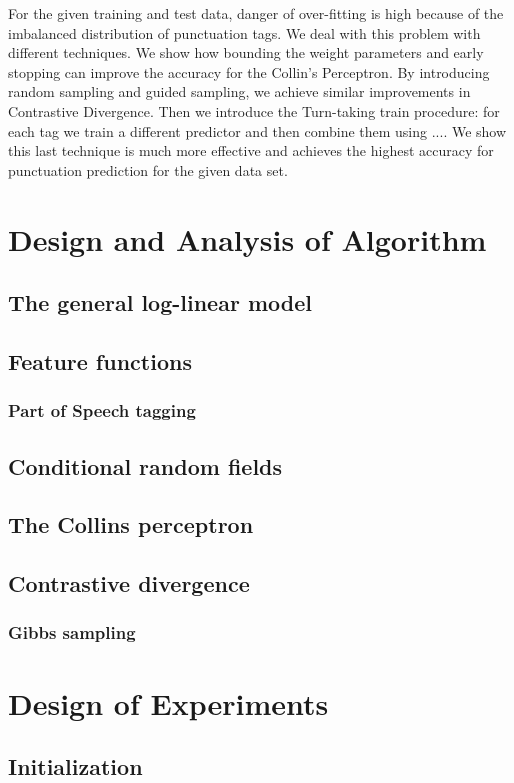 \documentclass[twoside,12pt]{article}
\begin{document}
For the given training and test data, danger of over-fitting is high because of the imbalanced distribution of punctuation tags. We deal with this problem with different techniques. We show how bounding the weight parameters and early stopping can improve the accuracy for the Collin's Perceptron. By introducing random sampling and guided sampling, we achieve similar improvements in Contrastive Divergence. Then we introduce the Turn-taking train procedure: for each tag we train a different predictor and then combine them using .... We show this last technique is much more effective and achieves the highest accuracy for punctuation prediction for the given data set.


\section{Design and Analysis of Algorithm}
\subsection{The general log-linear model}
\subsection{Feature functions}
\subsubsection{Part of Speech tagging}
\subsection{Conditional random fields}
\subsection{The Collins perceptron}
\subsection{Contrastive divergence}
\subsubsection{Gibbs sampling}
\section{Design of Experiments}
\subsection{Initialization}
\end{document}
